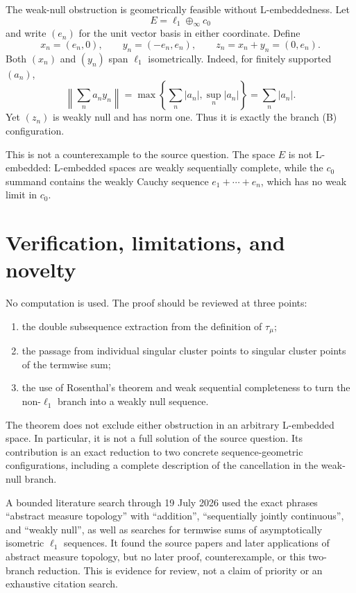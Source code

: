 \documentclass[11pt]{article}
\theoremstyle{definition}
\theoremstyle{remark}
\newcommand{\ellone}{\ell_1}
\newcommand{\taumu}{\tau_\mu}
\begin{document}
The weak-null obstruction is geometrically feasible without L-embeddedness.
Let
\[
            E=\ellone\oplus_\infty c_0
\]
and write $(e_n)$ for the unit vector basis in either coordinate.  Define
\[
       x_n=(e_n,0),\qquad y_n=(-e_n,e_n),\qquad z_n=x_n+y_n=(0,e_n).
\]
Both $(x_n)$ and $(y_n)$ span $\ellone$ isometrically.  Indeed, for finitely
supported $(a_n)$,
\[
 \left\|\sum_n a_ny_n\right\|
 =\max\left\{\sum_n|a_n|,\sup_n|a_n|\right\}
 =\sum_n|a_n|.
\]
Yet $(z_n)$ is weakly null and has norm one.  Thus it is exactly the branch
(B) configuration.

This is not a counterexample to the source question.  The space $E$ is not
L-embedded: L-embedded spaces are weakly sequentially complete, while the
$c_0$ summand contains the weakly Cauchy sequence
$e_1+\cdots+e_n$, which has no weak limit in $c_0$.

\section{Verification, limitations, and novelty}

No computation is used.  The proof should be reviewed at three points:
\begin{enumerate}[label=(\arabic*)]
\item the double subsequence extraction from the definition of $\taumu$;
\item the passage from individual singular cluster points to singular cluster
points of the termwise sum;
\item the use of Rosenthal's theorem and weak sequential completeness to turn
the non-$\ellone$ branch into a weakly null sequence.
\end{enumerate}

The theorem does not exclude either obstruction in an arbitrary L-embedded
space.  In particular, it is not a full solution of the source question.
Its contribution is an exact reduction to two concrete sequence-geometric
configurations, including a complete description of the cancellation in the
weak-null branch.

A bounded literature search through 19 July 2026 used the exact phrases
``abstract measure topology'' with ``addition'', ``sequentially jointly
continuous'', and ``weakly null'', as well as searches for termwise sums of
asymptotically isometric $\ellone$ sequences.  It found the source papers and
later applications of abstract measure topology, but no later proof,
counterexample, or this two-branch reduction.  This is evidence for review,
not a claim of priority or an exhaustive citation search.
\end{document}
